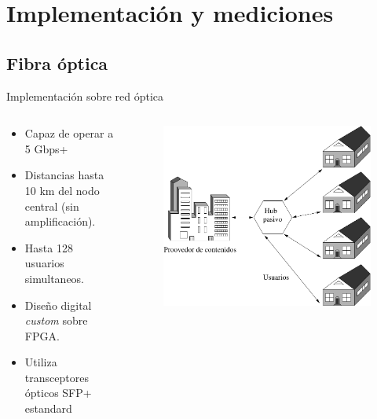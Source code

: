 \documentclass[aspectratio=169]{beamer}
\begin{document}
\section{Implementación y mediciones}
\subsection{Fibra óptica}


\begin{frame}{Implementación sobre red \color{red}óptica}

\begin{columns}
  \begin{column}{0.50\textwidth}

\begin{itemize}
 \item Capaz de operar a 5 Gbps+
 \item Distancias hasta 10 km del nodo central (sin amplificación).
 \item Hasta 128 usuarios simultaneos.
 \item Diseño digital \textit{custom} sobre FPGA.
 \item Utiliza transceptores ópticos SFP+ estandard
 \end{itemize}

  \end{column}
  \begin{column}{0.50\textwidth}

 
\begin{figure}[t]
  \centering
  \includegraphics[width=0.85 \textwidth]{../graphs/ftth.pdf} 
\end{figure}

  \end{column}
\end{columns}


\end{frame}
\end{document}
